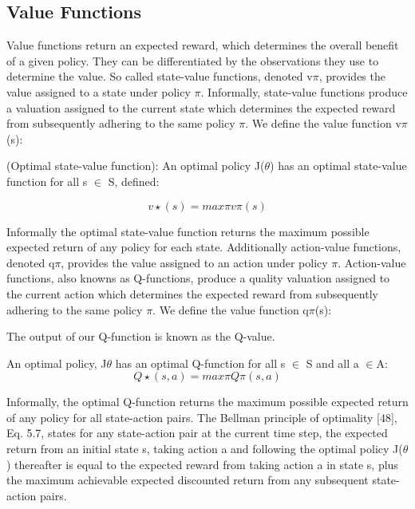 \documentclass[runningheads]{llncs}
\begin{document}
\subsection{Value Functions}
Value functions return an expected reward, which determines the overall benefit of a given
policy. They can be differentiated by the observations they use to determine the value. So called state-value functions, denoted v$\pi$, provides the value assigned to a state under
policy $\pi$. Informally, state-value functions produce a valuation assigned to the current
state which determines the expected reward from subsequently adhering to the same
policy $\pi$. We define the value function v$\pi$(s):


\begin{theorem}
	(Optimal state-value function): An optimal policy J($\theta$) has an optimal
	state-value function for all s $\in$ S, defined:
	
	\begin{equation}
		v\star(s) = max\pi v\pi(s)
	\end{equation}
\end{theorem}
Informally the optimal state-value function returns the maximum possible expected
return of any policy for each state. Additionally action-value functions, denoted q$\pi$,
provides the value assigned to an action under policy $\pi$. Action-value functions, also
knowns as Q-functions, produce a quality valuation assigned to the current action which
determines the expected reward from subsequently adhering to the same policy $\pi$. We
define the value function q$\pi$(s):
 
The output of our Q-function is known as the Q-value.

\begin{theorem}
An optimal policy, J$\theta$ has an optimal Q-function for
all s $\in$ S and all a $\in$A:
\begin{equation}
	Q\star(s,a) = max\pi Q\pi(s,a)
\end{equation} 
\end{theorem}

Informally, the optimal Q-function returns the maximum possible expected return
of any policy for all state-action pairs. The Bellman principle of optimality [48], Eq. 5.7,
states for any state-action pair at the current time step, the expected return from an initial
state s, taking action a and following the optimal policy J($\theta$) thereafter is equal to the
expected reward from taking action a in state s, plus the maximum achievable expected
discounted return from any subsequent state-action pairs.
\end{document}
